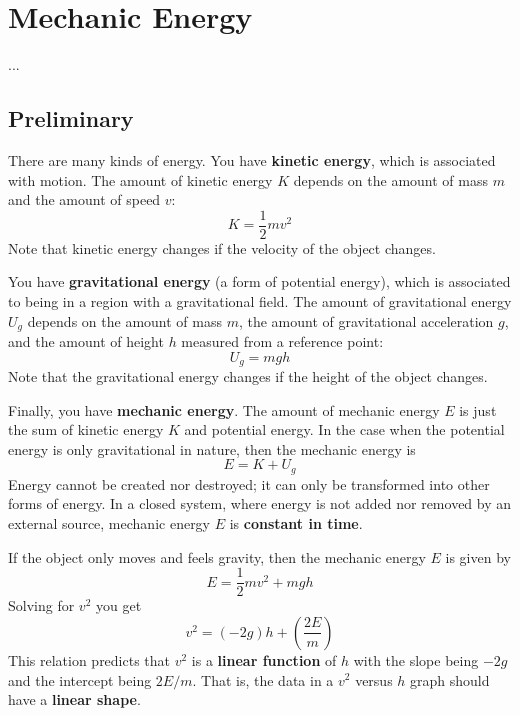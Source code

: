 \setcounter{chapter}{7}
\chapter{Mechanic Energy}
...
\section{Preliminary}
There are many kinds of energy. You have \textbf{kinetic energy}, which is associated with motion. The amount of kinetic energy $K$ depends on the amount of mass $m$ and the amount of speed $v$:
\begin{equation}
    K = \frac{1}{2} m v^{2}
\end{equation}
Note that kinetic energy changes if the velocity of the object changes.

You have \textbf{gravitational energy} (a form of potential energy), which is associated to being in a region with a gravitational field. The amount of gravitational energy $U_{g}$ depends on the amount of mass $m$, the amount of gravitational acceleration $g$, and the amount of height $h$ measured from a reference point:
\begin{equation}
    U_{g} = m g h
\end{equation}
Note that the gravitational energy changes if the height of the object changes.

Finally, you have \textbf{mechanic energy}. The amount of mechanic energy $E$ is just the sum of kinetic energy $K$ and potential energy. In the case when the potential energy is only gravitational in nature, then the mechanic energy is
\begin{equation}
    E = K + U_{g}
\end{equation}
Energy cannot be created nor destroyed; it can only be transformed into other forms of energy. In a closed system, where energy is not added nor removed by an external source, mechanic energy $E$ is \textbf{constant in time}.

If the object only moves and feels gravity, then the mechanic energy $E$ is given by
\begin{equation}
    E = \frac{1}{2} m v^{2} + m g h
\end{equation}
Solving for $v^{2}$ you get
\begin{equation} \label{eq.07.vv}
    v^{2} = \left( - 2 g \right) h + \left( \frac{2 E}{m} \right)
\end{equation}
This relation predicts that $v^{2}$ is a \textbf{linear function} of $h$ with the slope being $-2g$ and the intercept being $2 E / m$. That is, the data in a $v^{2}$ versus $h$ graph should have a \textbf{linear shape}.
